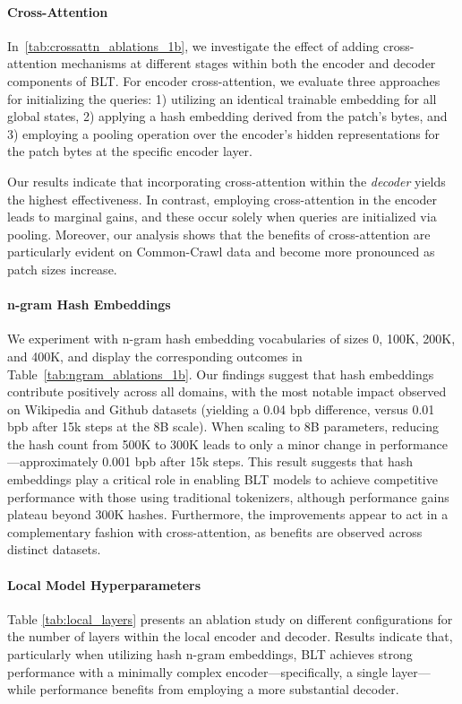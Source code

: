 \paragraph{Cross-Attention} 
In~\autoref{tab:crossattn_ablations_1b}, we investigate the effect of adding cross-attention mechanisms at different stages within both the encoder and decoder components of {\textsc BLT}. For encoder cross-attention, we evaluate three approaches for initializing the queries: 1) utilizing an identical trainable embedding for all global states, 2) applying a hash embedding derived from the patch's bytes, and 3) employing a pooling operation over the encoder’s hidden representations for the patch bytes at the specific encoder layer.

Our results indicate that incorporating cross-attention within the \textit{decoder} yields the highest effectiveness. In contrast, employing cross-attention in the encoder leads to marginal gains, and these occur solely when queries are initialized via pooling. Moreover, our analysis shows that the benefits of cross-attention are particularly evident on Common-Crawl data and become more pronounced as patch sizes increase.

\paragraph{n-gram Hash Embeddings} 

We experiment with n-gram hash embedding vocabularies of sizes 0, 100K, 200K, and 400K, and display the corresponding outcomes in Table~\ref{tab:ngram_ablations_1b}. Our findings suggest that hash embeddings contribute positively across all domains, with the most notable impact observed on Wikipedia and Github datasets (yielding a 0.04 bpb difference, versus 0.01 bpb after 15k steps at the 8B scale). When scaling to 8B parameters, reducing the hash count from 500K to 300K leads to only a minor change in performance—approximately 0.001 bpb after 15k steps. This result suggests that hash embeddings play a critical role in enabling {\textsc BLT} models to achieve competitive performance with those using traditional tokenizers, although performance gains plateau beyond 300K hashes. Furthermore, the improvements appear to act in a complementary fashion with cross-attention, as benefits are observed across distinct datasets.

\paragraph{Local Model Hyperparameters} Table \ref{tab:local_layers} presents an ablation study on different configurations for the number of layers within the local encoder and decoder. Results indicate that, particularly when utilizing hash n-gram embeddings, {\textsc BLT} achieves strong performance with a minimally complex encoder—specifically, a single layer—while performance benefits from employing a more substantial decoder.

